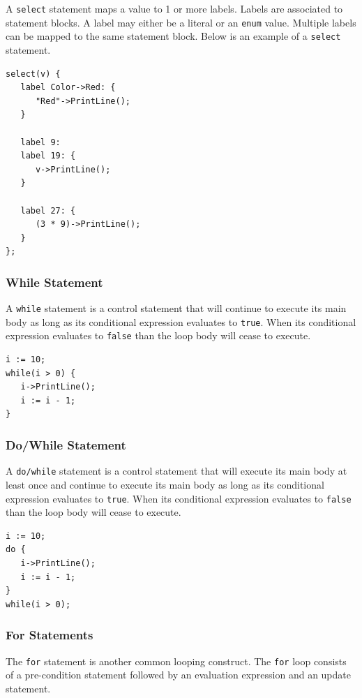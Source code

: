 \documentclass[12pt]{article}
\begin{document}
A \texttt{select} statement maps a value to 1 or more labels.  Labels
are associated to statement blocks.  A label may either be a literal
or an \texttt{enum} value.  Multiple labels can be mapped to the same
statement block.  Below is an example of a \texttt{select} statement.

\begin{verbatim}
select(v) {
   label Color->Red: {
      "Red"->PrintLine();
   }

   label 9:
   label 19: {
      v->PrintLine();
   }

   label 27: {
      (3 * 9)->PrintLine();
   }
};
\end{verbatim}

\subsubsection{While Statement}

A \texttt{while} statement is a control statement that will continue
to execute its main body as long as its conditional expression
evaluates to \texttt{true}.  When its conditional expression evaluates
to \texttt{false} than the loop body will cease to execute.

\begin{verbatim}
i := 10;
while(i > 0) {
   i->PrintLine();
   i := i - 1;
}
\end{verbatim}

\subsubsection{Do/While Statement}

A \texttt{do/while} statement is a control statement that will execute
its main body at least once and continue to execute its main body as
long as its conditional expression evaluates to \texttt{true}.  When
its conditional expression evaluates to \texttt{false} than the loop
body will cease to execute.

\begin{verbatim}
i := 10;
do { 
   i->PrintLine();
   i := i - 1;
} 
while(i > 0);
\end{verbatim}

\subsubsection{For Statements}

The \texttt{for} statement is another common looping construct.  The
\texttt{for} loop consists of a pre-condition statement followed by an
evaluation expression and an update statement.
\end{document}
